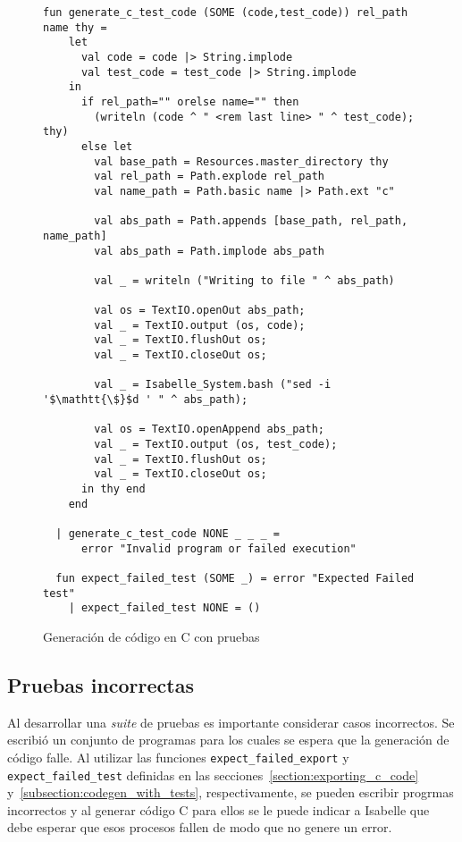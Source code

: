\begin{figure}
\begin{lstlisting}[mathescape=true]
  fun generate_c_test_code (SOME (code,test_code)) rel_path name thy =
    let
      val code = code |> String.implode
      val test_code = test_code |> String.implode
    in
      if rel_path="" orelse name="" then
        (writeln (code ^ " <rem last line> " ^ test_code); thy)
      else let
        val base_path = Resources.master_directory thy
        val rel_path = Path.explode rel_path
        val name_path = Path.basic name |> Path.ext "c"

        val abs_path = Path.appends [base_path, rel_path, name_path]
        val abs_path = Path.implode abs_path

        val _ = writeln ("Writing to file " ^ abs_path)

        val os = TextIO.openOut abs_path;
        val _ = TextIO.output (os, code);
        val _ = TextIO.flushOut os;
        val _ = TextIO.closeOut os;

        val _ = Isabelle_System.bash ("sed -i '$\mathtt{\$}$d ' " ^ abs_path);

        val os = TextIO.openAppend abs_path;
        val _ = TextIO.output (os, test_code);
        val _ = TextIO.flushOut os;
        val _ = TextIO.closeOut os;
      in thy end
    end

  | generate_c_test_code NONE _ _ _ =
      error "Invalid program or failed execution"

  fun expect_failed_test (SOME _) = error "Expected Failed test"
    | expect_failed_test NONE = ()
\end{lstlisting}

\caption{Generación de código en C con pruebas}
\label{fig:generate_c_test_code}
\end{figure}


\subsection{Pruebas incorrectas}

Al desarrollar una \textit{suite} de pruebas es importante considerar casos incorrectos.
Se escribió un conjunto de programas para los cuales se espera que la generación de código falle.
Al utilizar las funciones \verb|expect_failed_export| y \verb|expect_failed_test| definidas en las secciones~\ref{section:exporting_c_code} y~\ref{subsection:codegen_with_tests}, respectivamente, se pueden escribir progrmas incorrectos y al generar código C para ellos se le puede indicar a Isabelle que debe esperar que esos procesos fallen de modo que no genere un error.

